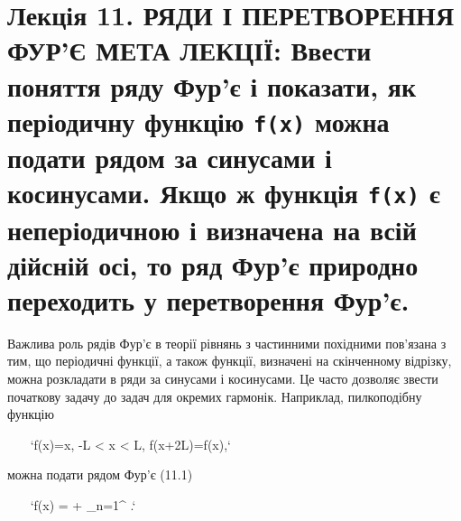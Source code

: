 \documentclass[
  ukrainian,
]{article}
\begin{document}
\section{\texorpdfstring{Лекція 11. РЯДИ І ПЕРЕТВОРЕННЯ ФУР'Є МЕТА
ЛЕКЦІЇ: Ввести поняття ряду Фур'є і показати, як періодичну функцію
\texttt{f(x)} можна подати рядом за синусами і косинусами. Якщо ж
функція \texttt{f(x)} є неперіодичною і визначена на всій дійсній осі,
то ряд Фур'є природно переходить у перетворення
Фур'є.}{Лекція 11. РЯДИ І ПЕРЕТВОРЕННЯ ФУР'Є МЕТА ЛЕКЦІЇ: Ввести поняття ряду Фур'є і показати, як періодичну функцію f(x) можна подати рядом за синусами і косинусами. Якщо ж функція f(x) є неперіодичною і визначена на всій дійсній осі, то ряд Фур'є природно переходить у перетворення Фур'є.}}\label{ux43bux435ux43aux446ux456ux44f-11.-ux440ux44fux434ux438-ux456-ux43fux435ux440ux435ux442ux432ux43eux440ux435ux43dux43dux44f-ux444ux443ux440ux454-ux43cux435ux442ux430-ux43bux435ux43aux446ux456ux457-ux432ux432ux435ux441ux442ux438-ux43fux43eux43dux44fux442ux442ux44f-ux440ux44fux434ux443-ux444ux443ux440ux454-ux456-ux43fux43eux43aux430ux437ux430ux442ux438-ux44fux43a-ux43fux435ux440ux456ux43eux434ux438ux447ux43dux443-ux444ux443ux43dux43aux446ux456ux44e-fx-ux43cux43eux436ux43dux430-ux43fux43eux434ux430ux442ux438-ux440ux44fux434ux43eux43c-ux437ux430-ux441ux438ux43dux443ux441ux430ux43cux438-ux456-ux43aux43eux441ux438ux43dux443ux441ux430ux43cux438.-ux44fux43aux449ux43e-ux436-ux444ux443ux43dux43aux446ux456ux44f-fx-ux454-ux43dux435ux43fux435ux440ux456ux43eux434ux438ux447ux43dux43eux44e-ux456-ux432ux438ux437ux43dux430ux447ux435ux43dux430-ux43dux430-ux432ux441ux456ux439-ux434ux456ux439ux441ux43dux456ux439-ux43eux441ux456-ux442ux43e-ux440ux44fux434-ux444ux443ux440ux454-ux43fux440ux438ux440ux43eux434ux43dux43e-ux43fux435ux440ux435ux445ux43eux434ux438ux442ux44c-ux443-ux43fux435ux440ux435ux442ux432ux43eux440ux435ux43dux43dux44f-ux444ux443ux440ux454.}

Важлива роль рядів Фур'є в теорії рівнянь з частинними похідними
пов'язана з тим, що періодичні функції, а також функції, визначені на
скінченному відрізку, можна розкладати в ряди за синусами і косинусами.
Це часто дозволяє звести початкову задачу до задач для окремих гармонік.
Наприклад, пилкоподібну функцію

~~~
`f(x)=x, \qquad -L < x < L, \qquad f(x+2L)=f(x),`
~~~

можна подати рядом Фур'є (11.1)

~~~
`f(x) =  + \sum_{n=1}^{\infty} .`
~~~
\end{document}
